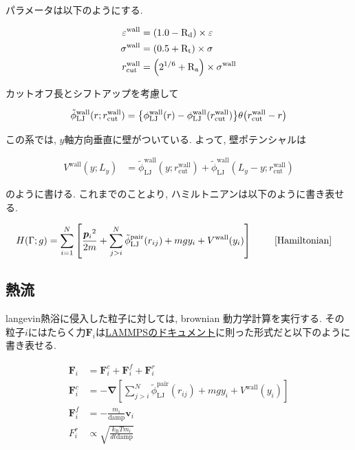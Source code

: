 パラメータは以下のようにする.

\begin{align}
  \varepsilon^{\text{wall}} &= \qty(1.0 - \text{R}_\text{d}) \times \varepsilon \\
  \sigma^{\text{wall}} &= \qty(0.5 + \text{R}_\text{t}) \times \sigma \\
  r^{\text{wall}}_{\text{cut}} &= \qty(2^{1/6} + \text{R}_\text{a}) \times \sigma^{\text{wall}}
\end{align}

カットオフ長とシフトアップを考慮して

\begin{align}
  \tilde{\phi}_{\text{LJ}}^{\text{wall}}(r;r_{\text{cut}}^{\text{wall}}) = \qty{\phi_{\text{LJ}}^{\text{wall}}(r) - \phi_{\text{LJ}}^{\text{wall}}(r_{\text{cut}}^{\text{wall}})}\theta \qty(r_{\text{cut}}^{\text{wall}}-r) \\
\end{align}

この系では, $y$軸方向垂直に壁がついている. よって, 壁ポテンシャルは

\begin{align}
  V^{\text{wall}}(y; L_y) &= \tilde{\phi}_{\text{LJ}}^{\text{wall}}(y;r_{\text{cut}}^{\text{wall}}) + \tilde{\phi}_{\text{LJ}}^{\text{wall}}(L_y - y;r_{\text{cut}}^{\text{wall}})
\end{align}

のように書ける. これまでのことより, ハミルトニアンは以下のように書き表せる.

\begin{align}
    H(\Gamma; g)
    &= \sum_{i=1}^{N}
    \left[
      \frac{{\bm{p}_i}^2}{2m} 
      + \sum_{j > i}^{N}
        \tilde{\phi}_{\text{LJ}}^{\text{pair}}(r_{ij})
      + mgy_i +V^{\text{wall}}(y_i)
    \right] \ \tag*{\eqref{Hamiltonian}} 
\end{align}

\subsection{熱流}

langevin熱浴に侵入した粒子に対しては, brownian 動力学計算を実行する. その粒子$i$にはたらく力$\bm{F}_i$は\href{https://docs.lammps.org/fix_langevin.html}{LAMMPSのドキュメント}に則った形式だと以下のように書き表せる.

\begin{align}
  \bm{F}_i &= \bm{F}_i^c + \bm{F}_i^f + \bm{F}_i^r \\
  \bm{F}_i^c &= - \bm{\nabla} 
  \left[
    \sum_{j > i}^{N}
        \tilde{\phi}_{\text{LJ}}^{\text{pair}}(r_{ij})
      + mgy_i +V^{\text{wall}}(y_i)
  \right]  \\
  \bm{F}_i^f &= -\frac{m_i}{\text{damp}}\bm{v}_i \\
  F_i^r &\propto \sqrt{\frac{k_\text{B} Tm_i}{dt \text{damp}}}
\end{align}

